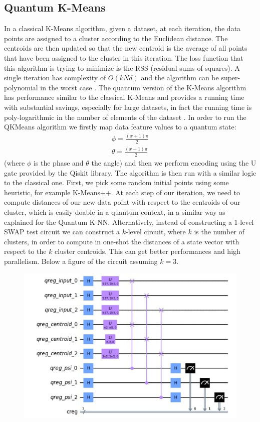 \documentclass{article}
\begin{document}
\begin{multicols}{2}
\subsection{Quantum K-Means}
In a classical K-Means algorithm, given a dataset, at each iteration, the data points are assigned to a cluster according to the Euclidean distance. The centroids are then updated so that the new centroid is the average of all points that have been assigned to the cluster in this iteration. The loss function that this algorithm is trying to minimize is the RSS (residual sums of squares). A single iteration has complexity of $O(kNd)$ and the algorithm can be super-polynomial in the worst case \cite{10.1145/1137856.1137880}.
The quantum version of the K-Means algorithm has performance similar to the classical K-Means and provides a running time with substantial savings, especially for large datasets, in fact the running time is poly-logarithmic in the number of elements of the dataset \cite{Kerenidis2018-gl}.
In order to run the QKMeans algorithm we firstly map data feature values to a quantum state:
\begin{align*}
\phi = \frac{(x+1)\pi}{2}\\
\theta = \frac{(x+1)\pi}{2}
\end{align*}
(where \(\phi\) is the phase and \(\theta\) the angle) and then we perform encoding using the U gate provided by the Qiskit library.
The algorithm is then run with a similar logic to the classical one. First, we pick some random initial points using some heuristic, for example K-Means++\cite{10.5555/1283383.1283494}. At each step of our iteration, we need to compute distances of our new data point with respect to the centroids of our cluster, which is easily doable in a quantum context, in a similar way as explained for the Quantum K-NN. Alternatively, instead of constructing a 1-level SWAP test circuit we can construct a $k$-level circuit, where $k$ is the number of clusters, in order to compute in one-shot the distances of a state vector with respect to the $k$ cluster centroids. This can get better performances and high parallelism. Below a figure of the circuit assuming $k=3$.
\begin{figure}[H]
  \centering
    \includegraphics[width=\linewidth]{assets/kmeans/qkmeans_circuit.jpg}
\end{figure}


\end{multicols}
\end{document}

